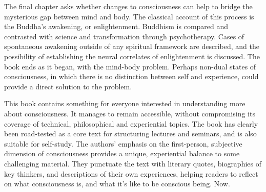 \documentclass[a4paper]{article}
\begin{document}
The final chapter asks whether changes to consciousness can help to bridge the
mysterious gap between mind and body. The classical account of this process is
the Buddha’s awakening, or enlightenment. Buddhism is compared and contrasted
with science and transformation through psychotherapy. Cases of spontaneous
awakening outside of any spiritual framework are described, and the
possibility of establishing the neural correlates of enlightenment is
discussed. The book ends as it began, with the mind-body problem. Perhaps
non-dual states of consciousness, in which there is no distinction between
self and experience, could provide a direct solution to the problem.

This book contains something for everyone interested in understanding more
about consciousness. It manages to remain accessible, without compromising its
coverage of technical, philosophical and experiential topics. The book has
clearly been road-tested as a core text for structuring lectures and seminars,
and is also suitable for self-study. The authors' emphasis on the
first-person, subjective dimension of consciousness provides a unique,
experiential balance to some challenging material. They punctuate the text
with literary quotes, biographies of key thinkers, and descriptions of their
own experiences, helping readers to reflect on what consciousness is, and what
it’s like to be conscious being. Now.
\end{document}
